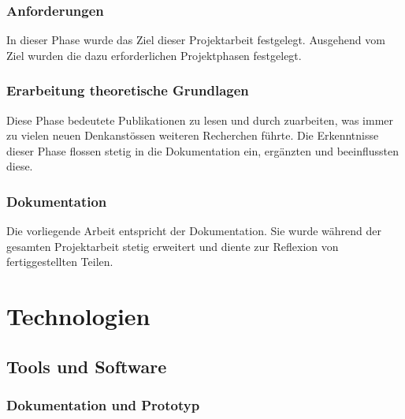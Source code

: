 \subsubsection{Anforderungen}
\label{ssubsec:requirements}

In dieser Phase wurde das Ziel dieser Projektarbeit festgelegt.
Ausgehend vom Ziel wurden die dazu erforderlichen Projektphasen
festgelegt.

\subsubsection{Erarbeitung theoretische Grundlagen}
\label{ssubsec:theoretical_background}

Diese Phase bedeutete Publikationen zu lesen und durch zuarbeiten, was 
immer zu vielen neuen Denkanstössen weiteren Recherchen führte. Die
Erkenntnisse dieser Phase flossen stetig in die Dokumentation ein,
ergänzten und beeinflussten diese.

\subsubsection{Dokumentation}
\label{ssubsec:documentation}

Die vorliegende Arbeit entspricht der Dokumentation. Sie wurde während
der gesamten Projektarbeit stetig erweitert und diente zur Reflexion von
fertiggestellten Teilen.

\section{Technologien}
\label{sec:technologies}

\subsection{Tools und Software}
\label{subsec:tools_software}

\subsubsection{Dokumentation und Prototyp}
\label{ssubsec:tools_software:documentation_prototype}

